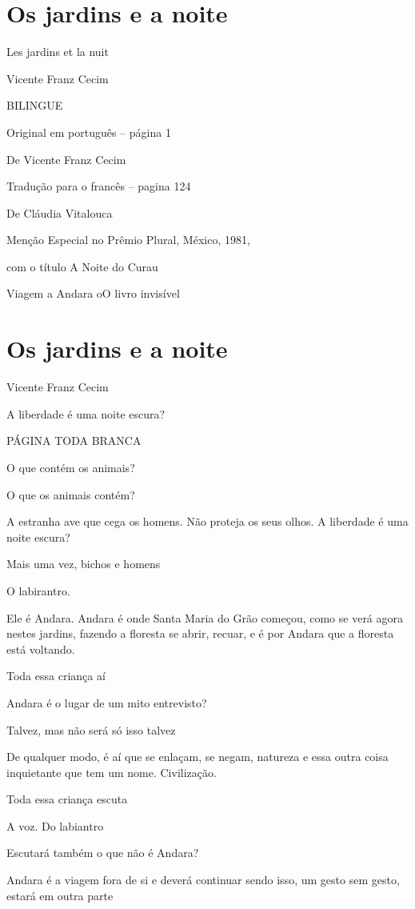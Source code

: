 \section{Os jardins e a noite}\label{os-jardins-e-a-noite}

Les jardins et la nuit

Vicente Franz Cecim

BILINGUE

Original em português -- página 1

De Vicente Franz Cecim

Tradução para o francês -- pagina 124

De Cláudia Vitalouca

Menção Especial no Prêmio Plural, México, 1981,

com o título A Noite do Curau

Viagem a Andara oO livro invisível

\section{Os jardins e a noite}\label{os-jardins-e-a-noite-1}

Vicente Franz Cecim

A liberdade é uma noite escura?

PÁGINA TODA BRANCA

O que contém os animais?

O que os animais contém?

A estranha ave que cega os homens. Não proteja os seus olhos. A
liberdade é uma noite escura?

Mais uma vez, bichos e homens

O labirantro.

Ele é Andara. Andara é onde Santa Maria do Grão começou, como se verá
agora nestes jardins, fazendo a floresta se abrir, recuar, e é por
Andara que a floresta está voltando.

Toda essa criança aí

Andara é o lugar de um mito entrevisto?

Talvez, mas não será só isso talvez

De qualquer modo, é aí que se enlaçam, se negam, natureza e essa outra
coisa inquietante que tem um nome. Civilização.

Toda essa criança escuta

A voz. Do labiantro

Escutará também o que não é Andara?

Andara é a viagem fora de si e deverá continuar sendo isso, um gesto sem
gesto, estará em outra parte

